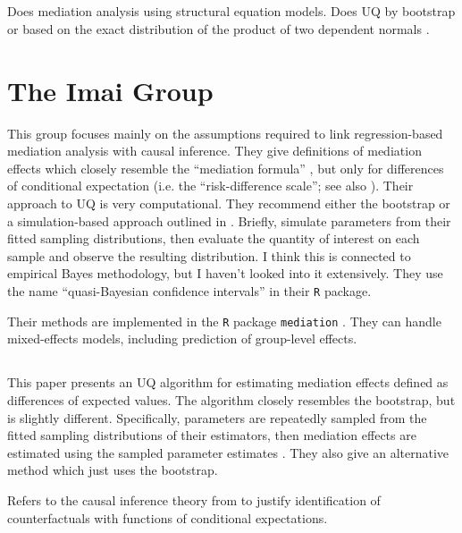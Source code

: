 \documentclass{article}
\begin{document}
\subsection{\citet{Pre10}}

Does mediation analysis using structural equation models. Does UQ by bootstrap or based on the exact distribution of the product of two dependent normals \citep{Mac07}.


\section{The Imai Group}
\label{sec:Imai}

This group focuses mainly on the assumptions required to link regression-based mediation analysis with causal inference. They give definitions of mediation effects which closely resemble the ``mediation formula'' \citep{Pea12}, but only for differences of conditional expectation (i.e. the ``risk-difference scale''; see also \citealp{Sam23}). Their approach to UQ is very computational. They recommend either the bootstrap or a simulation-based approach outlined in \citet{Kin00}. Briefly, simulate parameters from their fitted sampling distributions, then evaluate the quantity of interest on each sample and observe the resulting distribution. I think this is connected to empirical Bayes methodology, but I haven't looked into it extensively. They use the name ``quasi-Bayesian confidence intervals'' in their \texttt{R} package. 

Their methods are implemented in the \texttt{R} package \texttt{mediation} \citep{Tin14}. They can handle mixed-effects models, including prediction of group-level effects.


\subsection{\citet{Ima10I}}

This paper presents an UQ algorithm for estimating mediation effects defined as differences of expected values. The algorithm closely resembles the bootstrap, but is slightly different. Specifically, parameters are repeatedly sampled from the fitted sampling distributions of their estimators, then mediation effects are estimated using the sampled parameter estimates \citep[see, e.g.,][]{Kin00}. They also give an alternative method which just uses the bootstrap.

Refers to the causal inference theory from \citet{Ima10II} to justify identification of counterfactuals with functions of conditional expectations.
\end{document}
